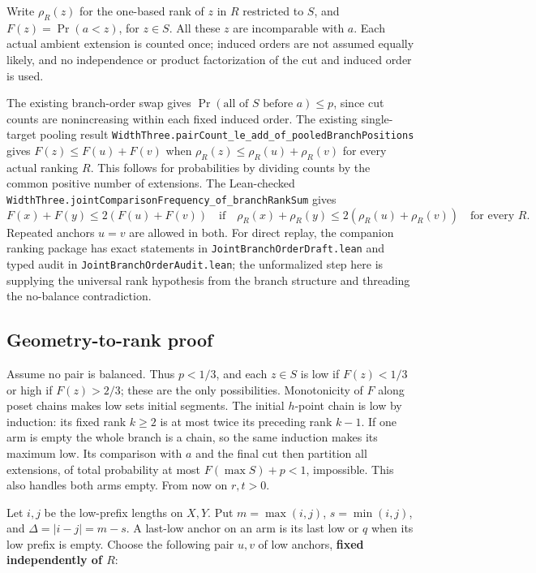 \documentclass[
  11pt,
]{article}
\begin{document}
Write \(\rho_R(z)\) for the one-based rank of \(z\) in \(R\) restricted
to \(S\), and \(F(z)=\Pr(a<z)\), for \(z\in S\). All these \(z\) are
incomparable with \(a\). Each actual ambient extension is counted once;
induced orders are not assumed equally likely, and no independence or
product factorization of the cut and induced order is used.

The existing branch-order swap gives
\(\Pr(\text{all of }S\text{ before }a)\le p\), since cut counts are
nonincreasing within each fixed induced order. The existing
single-target pooling result
\texttt{WidthThree.pairCount\_le\_add\_of\_pooledBranchPositions}\allowbreak{} gives
\(F(z)\le F(u)+F(v)\) when \(\rho_R(z)\le\rho_R(u)+\rho_R(v)\) for every
actual ranking \(R\). This follows for probabilities by dividing counts
by the common positive number of extensions. The Lean-checked
\texttt{WidthThree.jointComparisonFrequency\_of\_branchRankSum}\allowbreak{} gives \[
 F(x)+F(y)\le 2(F(u)+F(v))
 \quad\text{if}\quad
 \rho_R(x)+\rho_R(y)\le 2(\rho_R(u)+\rho_R(v))
 \quad\text{for every }R.
\] Repeated anchors \(u=v\) are allowed in both. For direct replay, the
companion ranking package has exact statements in
\texttt{JointBranchOrderDraft.lean} and typed audit in
\texttt{JointBranchOrderAudit.lean}; the unformalized step here is
supplying the universal rank hypothesis from the branch structure and
threading the no-balance contradiction.

\subsection{Geometry-to-rank proof}\label{geometry-to-rank-proof}

Assume no pair is balanced. Thus \(p<1/3\), and each \(z\in S\) is low
if \(F(z)<1/3\) or high if \(F(z)>2/3\); these are the only
possibilities. Monotonicity of \(F\) along poset chains makes low sets
initial segments. The initial \(h\)-point chain is low by induction: its
fixed rank \(k\ge2\) is at most twice its preceding rank \(k-1\). If one
arm is empty the whole branch is a chain, so the same induction makes
its maximum low. Its comparison with \(a\) and the final cut then
partition all extensions, of total probability at most
\(F(\max S)+p<1\), impossible. This also handles both arms empty. From
now on \(r,t>0\).

Let \(i,j\) be the low-prefix lengths on \(X,Y\). Put \(m=\max(i,j)\),
\(s=\min(i,j)\), and \(\Delta=|i-j|=m-s\). A last-low anchor on an arm
is its last low or \(q\) when its low prefix is empty. Choose the
following pair \(u,v\) of low anchors, \textbf{fixed independently of
\(R\)}:
\end{document}
